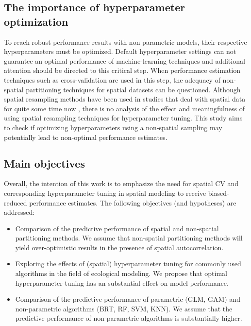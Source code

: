 \documentclass[review]{elsarticle}
\begin{document}
\subsection{The importance of hyperparameter optimization}
\label{subsec:importance_of_tuning}
To reach robust performance results with non-parametric models, their respective hyperparameters must be optimized.
Default hyperparameter settings can not guarantee an optimal performance of machine-learning techniques and additional attention should be directed to this critical step.
When performance estimation techniques such as cross-validation are used in this step, the adequacy of non-spatial partitioning techniques for spatial datasets can be questioned.
Although spatial resampling methods have been used in studies that deal with spatial data for quite some time now \citep{Geiss2017, Iturritxa2014, Meyer2018}, there is no analysis of the effect and meaningfulness of using spatial resampling techniques for hyperparameter tuning.
This study aims to check if optimizing hyperparameters using a non-spatial sampling may potentially lead to non-optimal performance estimates.

\subsection{Main objectives}
Overall, the intention of this work is to emphasize the need for spatial \ac{CV} and corresponding hyperparameter tuning in spatial modeling to receive biased-reduced performance estimates.
The following objectives (and hypotheses) are addressed:

\begin{itemize}
	\item Comparison of the predictive performance of spatial and non-spatial partitioning methods. We assume that non-spatial partitioning methods will yield over-optimistic results in the presence of spatial autocorrelation.
	\item Exploring the effects of (spatial) hyperparameter tuning for commonly used algorithms in the field of ecological modeling. We propose that optimal hyperparameter tuning has an substantial effect on model performance.
	\item Comparison of the predictive performance of parametric (GLM, GAM) and non-parametric algorithms (BRT, RF, SVM, KNN). We assume that the predictive performance of non-parametric algorithms is substantially higher.
\end{itemize}
\end{document}
